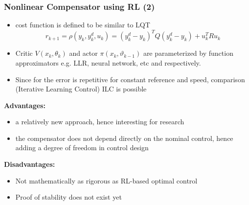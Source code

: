 \documentclass{beamer}
\begin{document}
			\begin{frame}\frametitle{Nonlinear Compensator using RL (2)}
				\vspace{3mm}
				\fontsize{8}{4}\selectfont 
				\begin{itemize}
					\item cost function is defined to be similar to LQT
					\begin{equation}
					r_{k+1} = \rho(y_k, y^d_k, u_k) = (y^d_k - y_k)^TQ(y^d_k - y_k) + u_k^TRu_k
					\end{equation}
					\item Critic $V(x_k,\theta_k)$ and actor $\pi(x_k,\vartheta_{k-1})$ are parameterized by function approximators e.g. LLR, neural network, etc and  respectively.
					\item Since for the error is repetitive for constant reference and speed, comparison (Iterative Learning Control) ILC is possible
				\end{itemize}
				\vspace{4mm}
				\pause
				\textbf{Advantages:}
				\begin{itemize}
					\item a relatively new approach, hence interesting for research
					\item the compensator does not depend directly on the nominal control, hence adding a degree of freedom in control design 
				\end{itemize}
				\vspace{2mm}
				\pause
				\textbf{Disadvantages:}
				\begin{itemize}
					\item Not mathematically as rigorous as RL-based optimal control 
					\item Proof of stability does not exist yet
				\end{itemize}
			\end{frame}											
			
\end{document}
